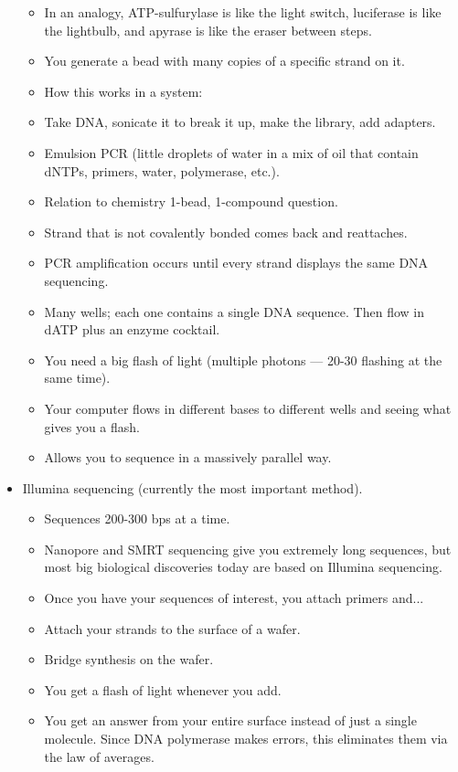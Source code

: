 \documentclass[../notes.tex]{subfiles}
\begin{document}
\begin{itemize}
\begin{itemize}
        \item In an analogy, ATP-sulfurylase is like the light switch, luciferase is like the lightbulb, and apyrase is like the eraser between steps.
        \item You generate a bead with many copies of a specific strand on it.
        \item How this works in a system:
        \item Take DNA, sonicate it to break it up, make the library, add adapters.
        \item Emulsion PCR (little droplets of water in a mix of oil that contain dNTPs, primers, water, polymerase, etc.).
        \item Relation to chemistry 1-bead, 1-compound question.
        \item Strand that is not covalently bonded comes back and reattaches.
        \item PCR amplification occurs until every strand displays the same DNA sequencing.
        \item Many wells; each one contains a single DNA sequence. Then flow in dATP plus an enzyme cocktail.
        \item You need a big flash of light (multiple photons --- 20-30 flashing at the same time).
        \item Your computer flows in different bases to different wells and seeing what gives you a flash.
        \item Allows you to sequence in a massively parallel way.
    \end{itemize}
    \item Illumina sequencing (currently the most important method).
    \begin{itemize}
        \item Sequences 200-300 bps at a time.
        \item Nanopore and SMRT sequencing give you extremely long sequences, but most big biological discoveries today are based on Illumina sequencing.
        \item Once you have your sequences of interest, you attach primers and...
        \item Attach your strands to the surface of a wafer.
        \item Bridge synthesis on the wafer.
        \item You get a flash of light whenever you add.
        \item You get an answer from your entire surface instead of just a single molecule. Since DNA polymerase makes errors, this eliminates them via the law of averages.

\end{itemize}
\end{itemize}
\end{document}
